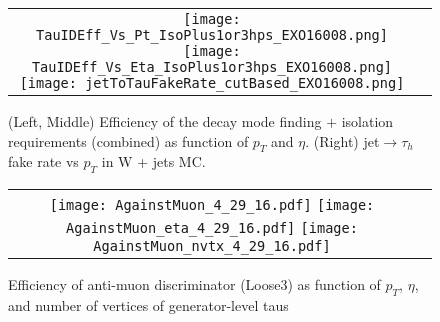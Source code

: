 \begin{figure}[tbh!]
    \centering
    \begin{tabular}{cc}
      \texttt{[image: TauIDEff\_Vs\_Pt\_IsoPlus1or3hps\_EXO16008.png]}
      \texttt{[image: TauIDEff\_Vs\_Eta\_IsoPlus1or3hps\_EXO16008.png]}
       \texttt{[image: jetToTauFakeRate\_cutBased\_EXO16008.png]}
    \end{tabular}
    \caption{(Left, Middle) Efficiency of the decay mode finding $+$ isolation requirements (combined) as function of $p_{T}$ and $\eta$. (Right) jet$\to\tau_{h}$ 
fake rate vs $p_{T}$ in W + jets MC.}
    \label{fig:DMF}
  \end{figure}
 
\begin{figure}[tbh!]
    \centering
    \begin{tabular}{cc}
      \texttt{[image: AgainstMuon\_4\_29\_16.pdf]}
      \texttt{[image: AgainstMuon\_eta\_4\_29\_16.pdf]}
       \texttt{[image: AgainstMuon\_nvtx\_4\_29\_16.pdf]}
    \end{tabular}
    \caption{Efficiency of anti-muon discriminator (Loose3) as function of $p_{T}$, $\eta$, and number of vertices of generator-level taus }
    \label{fig:ML3}
  \end{figure}


%



